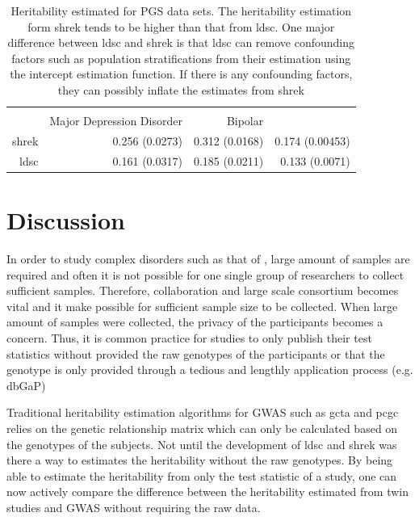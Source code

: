 		
		\begin{table}
			\centering
			\begin{tabular}{rrrr}
				\toprule
				 \\
				& Major Depression Disorder & Bipolar & \Glng{scz}\\
				\midrule
				\gls{shrek}   & 0.256 (0.0273)  & 0.312 (0.0168)  & 0.174 (0.00453) \\
				\gls{ldsc}   & 0.161 (0.0317) & 0.185 (0.0211) & 0.133 (0.0071)\\
				\bottomrule
			\end{tabular}
			\caption[Heritability Estimated for PGC Data Sets]{
				Heritability estimated for \gls{PGS} data sets.
				The heritability estimation form \gls{shrek} tends to be higher than that from \gls{ldsc}.
				One major difference between \gls{ldsc} and \gls{shrek} is that \gls{ldsc} can remove confounding factors such as population stratifications from their estimation using the intercept estimation function. 
				If there is any confounding factors, they can possibly inflate the estimates from \gls{shrek}
			}
			\label{tab:realData}
		\end{table}
	\section{Discussion}
	In order to study complex disorders such as that of , large amount of samples are required and often it is not possible for one single group of researchers to collect sufficient samples.
	Therefore, collaboration and large scale consortium becomes vital and it make possible for sufficient sample size to be collected.
	When large amount of samples were collected, the privacy of the participants becomes a concern. 
	Thus, it is common practice for studies to only publish their test statistics without provided the raw genotypes of the participants or that the genotype is only provided through a tedious and lengthly application process (e.g. dbGaP)
	
	Traditional heritability estimation algorithms for \gls{GWAS} such as \gls{gcta} and \gls{pcgc} relies on the genetic relationship matrix which can only be calculated based on the genotypes of the subjects.
	Not until the development of \gls{ldsc} and \gls{shrek} was there a way to estimates the heritability without the raw genotypes.
	By being able to estimate the heritability from only the test statistic of a study, one can now actively compare the difference between the heritability estimated from twin studies and \gls{GWAS} without requiring the raw data.
	
